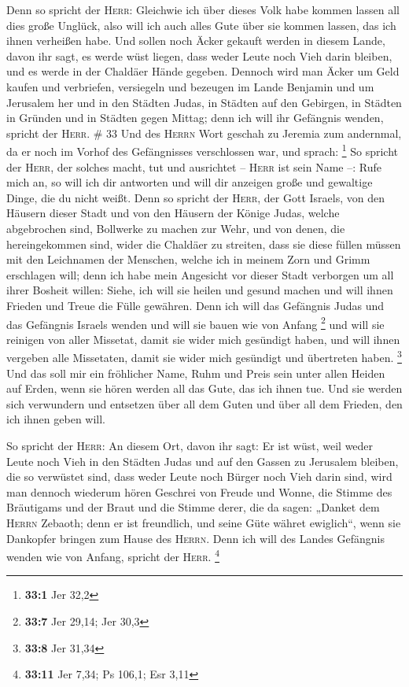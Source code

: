  Denn so spricht der \textsc{Herr}: Gleichwie ich über
dieses Volk habe kommen lassen all dies große Unglück, also will ich
auch alles Gute über sie kommen lassen, das ich ihnen verheißen habe.
 Und sollen noch Äcker gekauft werden in diesem Lande,
davon ihr sagt, es werde wüst liegen, dass weder Leute noch Vieh darin
bleiben, und es werde in der Chaldäer Hände gegeben. 
Dennoch wird man Äcker um Geld kaufen und verbriefen, versiegeln und
bezeugen im Lande Benjamin und um Jerusalem her und in den Städten
Judas, in Städten auf den Gebirgen, in Städten in Gründen und in Städten
gegen Mittag; denn ich will ihr Gefängnis wenden, spricht der
\textsc{Herr}. \# 33  Und des \textsc{Herrn} Wort geschah
zu Jeremia zum andernmal, da er noch im Vorhof des Gefängnisses
verschlossen war, und sprach: \footnote{\textbf{33:1} Jer 32,2}
 So spricht der \textsc{Herr}, der solches macht, tut und
ausrichtet -- \textsc{Herr} ist sein Name --:  Rufe mich
an, so will ich dir antworten und will dir anzeigen große und gewaltige
Dinge, die du nicht weißt.  Denn so spricht der
\textsc{Herr}, der Gott Israels, von den Häusern dieser Stadt und von
den Häusern der Könige Judas, welche abgebrochen sind, Bollwerke zu
machen zur Wehr,  und von denen, die hereingekommen sind,
wider die Chaldäer zu streiten, dass sie diese füllen müssen mit den
Leichnamen der Menschen, welche ich in meinem Zorn und Grimm erschlagen
will; denn ich habe mein Angesicht vor dieser Stadt verborgen um all
ihrer Bosheit willen:  Siehe, ich will sie heilen und
gesund machen und will ihnen Frieden und Treue die Fülle gewähren.
 Denn ich will das Gefängnis Judas und das Gefängnis
Israels wenden und will sie bauen wie von Anfang \footnote{\textbf{33:7}
  Jer 29,14; Jer 30,3}  und will sie reinigen von aller
Missetat, damit sie wider mich gesündigt haben, und will ihnen vergeben
alle Missetaten, damit sie wider mich gesündigt und übertreten haben.
\footnote{\textbf{33:8} Jer 31,34}  Und das soll mir ein
fröhlicher Name, Ruhm und Preis sein unter allen Heiden auf Erden, wenn
sie hören werden all das Gute, das ich ihnen tue. Und sie werden sich
verwundern und entsetzen über all dem Guten und über all dem Frieden,
den ich ihnen geben will.

 So spricht der \textsc{Herr}: An diesem Ort, davon ihr
sagt: Er ist wüst, weil weder Leute noch Vieh in den Städten Judas und
auf den Gassen zu Jerusalem bleiben, die so verwüstet sind, dass weder
Leute noch Bürger noch Vieh darin sind,  wird man dennoch
wiederum hören Geschrei von Freude und Wonne, die Stimme des Bräutigams
und der Braut und die Stimme derer, die da sagen: „Danket dem
\textsc{Herrn} Zebaoth; denn er ist freundlich, und seine Güte währet
ewiglich``, wenn sie Dankopfer bringen zum Hause des \textsc{Herrn}.
Denn ich will des Landes Gefängnis wenden wie von Anfang, spricht der
\textsc{Herr}. \footnote{\textbf{33:11} Jer 7,34; Ps 106,1; Esr 3,11}

